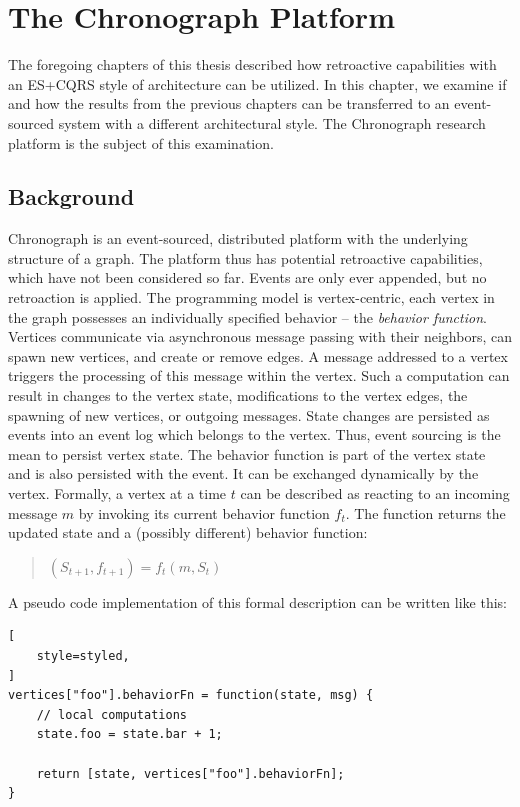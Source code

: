 \chapter{The Chronograph Platform}
\label{chp:chrono}

The foregoing chapters of this thesis described how retroactive capabilities 
with an ES+CQRS style of architecture can be utilized. In this chapter, we 
examine if and how the results from the previous chapters can be transferred 
to an event-sourced system with a different architectural style. The 
Chronograph research platform is the subject of this examination.

\section{Background}
Chronograph \cite{Erb2015} is an event-sourced, distributed platform with the 
underlying structure of a graph.
The platform thus has potential retroactive capabilities, which have not been 
considered so far. Events are only ever appended, but no retroaction is applied. 
The programming model is vertex-centric, each vertex in the graph possesses an 
individually specified behavior -- the \emph{behavior function}. Vertices 
communicate via asynchronous message passing with their neighbors, can spawn 
new vertices, and create or remove edges. 
%
A message addressed to a vertex triggers the processing of this message within 
the vertex. Such a computation can result in changes to the vertex state, 
modifications to the vertex edges, the spawning of new vertices, or outgoing 
messages. State changes are persisted as events into an event log which 
belongs to the vertex. Thus, event sourcing is the mean to persist vertex 
state. The behavior function is part of the vertex state and is also persisted 
with the event. It can be exchanged dynamically by the vertex. 
Formally, a vertex at a time $t$ can be described as reacting to an incoming 
message $m$ by invoking its current behavior function $f_t$. The function 
returns the updated state and a (possibly different) behavior function:

\begin{quote}
\centering
$ (S_{t+1}, f_{t+1}) = f_t (m, S_t)$
\end{quote}

\noindent{}A pseudo code implementation of this formal description can be 
written like this:

\begin{lstlisting}[
	style=styled, 
]
vertices["foo"].behaviorFn = function(state, msg) {
	// local computations
	state.foo = state.bar + 1;

	return [state, vertices["foo"].behaviorFn];
}
\end{lstlisting}

